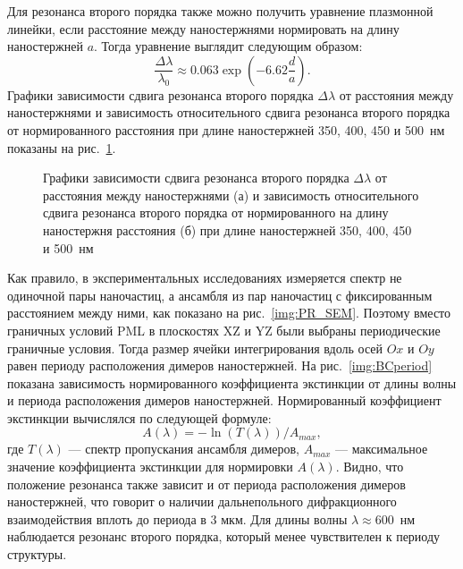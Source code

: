 Для резонанса второго порядка также можно получить уравнение плазмонной линейки, если расстояние между наностержнями нормировать на длину наностержней $ a $. Тогда уравнение выглядит следующим образом:
\begin{equation}
\frac{\Delta \lambda}{\lambda_0} \approx 0.063 \exp \left( - 6.62 \frac{d}{a} \right).
\end{equation}
Графики зависимости сдвига резонанса второго порядка $ \Delta \lambda $ от расстояния между наностержнями и зависимость относительного сдвига резонанса второго порядка от нормированного расстояния при длине наностержней 350, 400, 450 и 500~нм показаны на рис.~\ref{img:ruler2}.

\begin{figure}
\caption{Графики зависимости сдвига резонанса второго порядка $ \Delta \lambda $ от расстояния между наностержнями (а) и зависимость относительного сдвига резонанса второго порядка от нормированного на длину  наностержня расстояния (б) при длине наностержней 350, 400, 450 и 500~нм }
\label{img:ruler2}
\end{figure}

Как правило, в экспериментальных исследованиях измеряется спектр не одиночной пары наночастиц, а ансамбля из пар наночастиц с фиксированным расстоянием между ними, как показано на рис.~\ref{img:PR_SEM}. Поэтому вместо граничных условий PML в плоскостях XZ и YZ были выбраны периодические граничные условия. Тогда размер ячейки интегрирования вдоль осей $ Ox $ и $ Oy $ равен периоду расположения димеров наностержней. На рис.~\ref{img:BCperiod} показана зависимость нормированного коэффициента экстинкции от длины волны и периода расположения димеров наностержней. Нормированный коэффициент экстинкции вычислялся по следующей формуле:
\begin{equation}
A(\lambda) = - \ln (T(\lambda))/A_{max},
\end{equation}
где $ T(\lambda) $ --- спектр пропускания ансамбля димеров, $ A_{max} $ --- максимальное значение коэффициента экстинкции для нормировки $ A(\lambda) $. Видно, что положение резонанса также зависит и от периода расположения димеров наностержней, что говорит о наличии дальнепольного дифракционного взаимодействия  вплоть до периода в 3 мкм. Для длины волны $ \lambda \approx 600$~нм наблюдается резонанс второго порядка, который менее чувствителен к периоду структуры.

